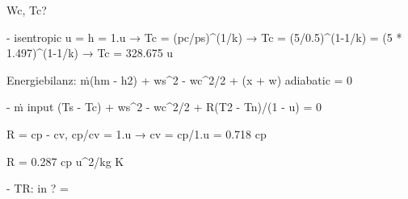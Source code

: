 Wc, Tc?

- isentropic u = h = 1.u → Tc = (pc/ps)^(1/k) → Tc = (5/0.5)^(1-1/k) = (5 * 1.497)^(1-1/k) → Tc = 328.675 u

Energiebilanz: ṁ(hm - h2) + ws^2 - wc^2/2 + (x + w) adiabatic = 0

- ṁ input (Ts - Tc) + ws^2 - wc^2/2 + R(T2 - Tn)/(1 - u) = 0

R = cp - cv, cp/cv = 1.u → cv = cp/1.u = 0.718 cp

R = 0.287 cp u^2/kg K

- TR: in ? =